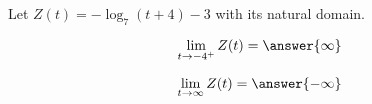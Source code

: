 \documentclass{ximera}
\author{Lee Wayand}
\begin{document}
\begin{exercise}






Let $Z(t) = -\log_7(t+4) - 3$ with its natural domain. \\







\begin{question}


\[
\lim\limits_{t \to -4^+} Z(t) = \answer{\infty}
\]


\end{question}








\begin{question}


\[
\lim\limits_{t \to \infty} Z(t) = \answer{-\infty}
\]


\end{question}










\end{exercise}
\end{document}
